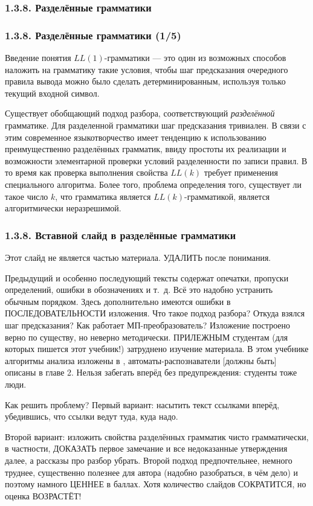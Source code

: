 \subsubsection{1.3.8. Разделённые грамматики}\label{1.3.8.}
\begin{frame}
\frametitle{1.3.8. Разделённые грамматики (1/5)}
Введение понятия $LL(1)$-грамматики — это один из возможных способов наложить на грамматику такие условия, чтобы шаг предсказания очередного правила вывода можно было сделать детерминированным, используя только текущий входной символ.

\smallskip
Существует обобщающий подход разбора, соответствующий {\em разделённой} грамматике. 
Для разделенной грамматики шаг предсказания тривиален. В связи с этим современное языкотворчество имеет тенденцию к использованию преимущественно разделённых грамматик,
ввиду простоты их реализации и возможности элементарной проверки условий разделенности по записи правил.
В то время как проверка выполнения свойства 
$LL(k)$ требует применения специального алгоритма.
Более того, проблема определения того, существует ли такое число $k$,
что грамматика является $LL(k)$-грамматикой,
является алгоритмически неразрешимой.  
\end{frame}

\begin{frame}
\frametitle{1.3.8. Вставной слайд в разделённые грамматики}
Этот слайд не является частью материала. УДАЛИТЬ после понимания.

\smallskip
Предыдущий и особенно последующий тексты содержат опечатки,
пропуски определений, ошибки в обозначениях и т.~д.
Всё это надобно устранить обычным порядком.
Здесь дополнительно имеются ошибки в ПОСЛЕДОВАТЕЛЬНОСТИ изложения.
Что такое подход разбора? Откуда взялся шаг предсказания?
Как работает МП-преобразователь?  
Изложение построено верно по существу,
но неверно методически.
ПРИЛЕЖНЫМ студентам (для которых пишется этот учебник!)
затруднено изучение материала.
В этом учебнике алгоритмы анализа
изложены в ,
автоматы-распознаватели [должны быть] описаны в главе 2.
Нельзя забегать вперёд без предупреждения: студенты тоже люди.

\smallskip
Как решить проблему?
Первый вариант: насытить текст ссылками вперёд,
убедившись, что ссылки ведут туда, куда надо.

\smallskip
Второй вариант: 
изложить свойства разделённых грамматик чисто грамматически, в частности,
ДОКАЗАТЬ первое замечание и все недоказанные утверждения далее,
 а рассказы про разбор убрать.
Второй подход предпочтельнее, немного труднее,
существенно полезнее для автора (надобно разобраться, в чём дело)
и поэтому намного ЦЕННЕЕ в баллах. 
Хотя количество слайдов СОКРАТИТСЯ, но оценка ВОЗРАСТЁТ! 

\end{frame}

